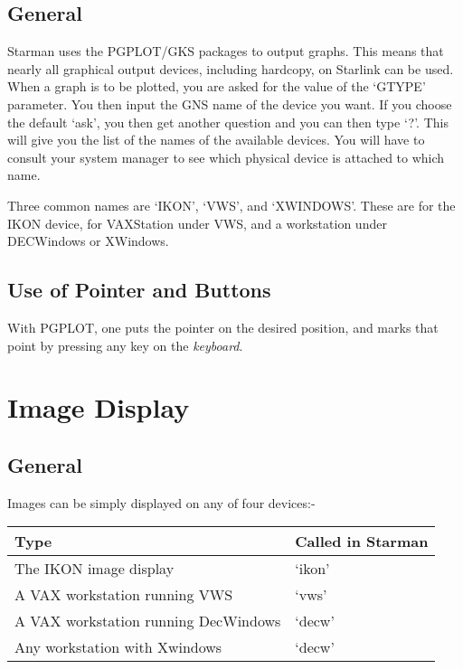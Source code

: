\subsection{General}

Starman uses the PGPLOT/GKS packages to output graphs. This means that
nearly all graphical output devices, including hardcopy, on Starlink can be
used. When a graph is to be plotted, you are asked for the value of the
`GTYPE' parameter. You then input the GNS name of the device you want. If
you choose the default `ask', you then get another question and you can
then type `?'. This will give you the list of the names of the available
devices. You will have to consult your system manager to see which physical
device is attached to which name. 

Three common names are `IKON', `VWS', and `XWINDOWS'. These are for the
IKON device, for VAXStation under VWS, and a workstation under DECWindows
or XWindows.

\subsection{Use of Pointer and Buttons}

With PGPLOT, one puts the pointer on the desired position, and marks that
point by pressing any key on the {\em keyboard}.

\section{Image Display}

\subsection{General}

Images can be simply displayed on any of four devices:-

\hspace{4ex} \begin{tabular}[c]{|l|l|} \hline
    Type                    &                 Called in Starman \\ \hline
    The IKON image display                  &    `ikon'  \\
    A VAX workstation running VWS           &    `vws'  \\
    A VAX workstation running DecWindows    &    `decw'  \\ 
    Any workstation with Xwindows           &    `decw' \\ \hline
\end{tabular}


